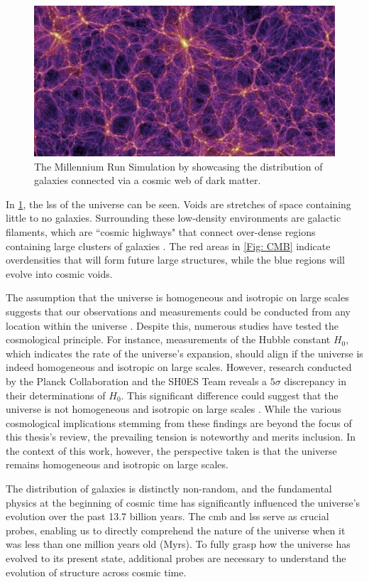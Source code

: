 \begin{figure}
    \centering
    \includegraphics[width=\linewidth]{Figures/galaxy_distribution.png}
    \caption{The Millennium Run Simulation by \cite{springel_simulations_2005} showcasing the distribution of galaxies connected via a cosmic web of dark matter.}
    \label{Fig: Galaxy Distribution}
\end{figure}

In \cref{Fig: Galaxy Distribution}, the \gls{lss} of the universe can be seen. Voids are stretches of space containing little to no galaxies. Surrounding these low-density environments are galactic filaments, which are ``cosmic highways" that connect over-dense regions containing large clusters of galaxies \citep{darvish_cosmic_2014, okane_effect_2024}. The red areas in \cref{Fig: CMB} indicate overdensities that will form future large structures, while the blue regions will evolve into cosmic voids.

The assumption that the universe is homogeneous and isotropic on large scales suggests that our observations and measurements could be conducted from any location within the universe \citep{clarkson_general_2008}. Despite this, numerous studies have tested the cosmological principle. For instance, measurements of the Hubble constant $H_0$, which indicates the rate of the universe's expansion, should align if the universe is indeed homogeneous and isotropic on large scales. However, research conducted by the Planck Collaboration \citep{planck_collaboration_planck_2020-1} and the SH0ES Team \citep{riess_comprehensive_2022} reveals a $5\sigma$ discrepancy in their determinations of $H_0$. This significant difference could suggest that the universe is not homogeneous and isotropic on large scales \citep{hu_testing_2024}. While the various cosmological implications stemming from these findings are beyond the focus of this thesis's review, the prevailing tension is noteworthy and merits inclusion. In the context of this work, however, the perspective taken is that the universe remains homogeneous and isotropic on large scales.

The distribution of galaxies is distinctly non-random, and the fundamental physics at the beginning of cosmic time has significantly influenced the universe's evolution over the past 13.7 billion years. The \gls{cmb} and \gls{lss} serve as crucial probes, enabling us to directly comprehend the nature of the universe when it was less than one million years old (Myrs). To fully grasp how the universe has evolved to its present state, additional probes are necessary to understand the evolution of structure across cosmic time.